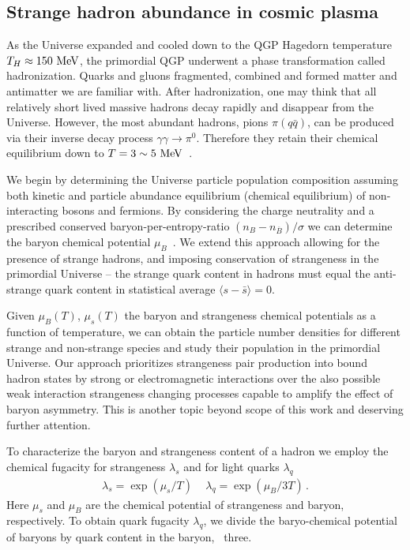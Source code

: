 \subsection{Strange hadron abundance in cosmic plasma}
\label{Strangeness}
As the Universe expanded and cooled down to the QGP Hagedorn temperature $T_H\approx150\text{ MeV}$, the primordial QGP underwent a phase transformation called hadronization. Quarks and gluons fragmented, combined and formed matter and antimatter  we are familiar with. After hadronization, one may think that all relatively short lived massive hadrons decay rapidly and disappear from the Universe. However, the most abundant hadrons, pions $\pi(q\bar q)$, can be produced via their inverse decay process $\gamma\gamma\rightarrow\pi^0$. Therefore they retain their chemical equilibrium  down to $T=3\sim5\text{ MeV}$~\cite{Kuznetsova:2008jt}. 

We begin by determining the Universe particle population composition assuming both kinetic and particle abundance equilibrium (chemical equilibrium) of non-interacting bosons and fermions. By considering the charge neutrality and a prescribed conserved baryon-per-entropy-ratio ${(n_B-n_{\overline{B}})}/{\sigma}$ we can  determine the baryon chemical potential $\mu_B$~\cite{Fromerth:2002wb,Fromerth:2012fe,Rafelski:2013yka}. We extend this approach  allowing for the presence of strange hadrons, and imposing conservation of strangeness in the primordial Universe -- the  strange quark content in hadrons must equal the anti-strange quark content in statistical average $\langle s-\bar s \rangle=0$. 

Given $\mu_B(T)$, $\mu_s(T)$ the baryon and strangeness chemical potentials as a function of temperature, we can obtain the particle number densities for different strange and non-strange species and study their population in the primordial Universe. Our approach prioritizes strangeness pair production into bound hadron states by strong or electromagnetic interactions over the also possible weak interaction strangeness changing processes capable to amplify the effect of baryon asymmetry. This is another topic beyond scope of this work and deserving further attention.

To characterize the baryon and strangeness content of a hadron we employ the chemical fugacity for strangeness $\lambda_s$ and for light quarks $\lambda_q$ 
\begin{align}
\lambda_s=\exp(\mu_s/T)\,\quad \lambda_q=\exp(\mu_B/3T)\,.
\end{align}
Here $\mu_s$ and $\mu_B$ are the chemical potential of strangeness and baryon, respectively. To obtain quark fugacity $\lambda_q$, we divide the baryo-chemical potential of baryons by quark content in the baryon, \ie\ three.

